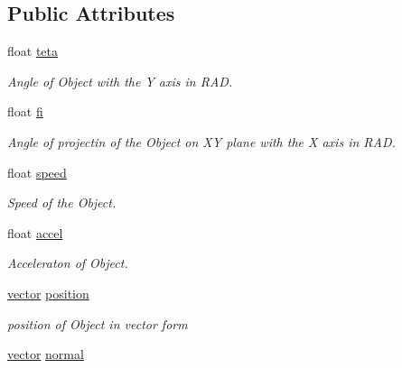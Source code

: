 \subsection*{\-Public \-Attributes}
\begin{DoxyCompactItemize}
\item 
\hypertarget{classobject_ab88f69538586ed8b4eccdd72ff9736e9}{float \hyperlink{classobject_ab88f69538586ed8b4eccdd72ff9736e9}{teta}}\label{classobject_ab88f69538586ed8b4eccdd72ff9736e9}

\begin{DoxyCompactList}\small\item\em \-Angle of \-Object with the \-Y axis in \-R\-A\-D. \end{DoxyCompactList}\item 
\hypertarget{classobject_a9ca57ce8fdbfbc35555f0a976930d0ac}{float \hyperlink{classobject_a9ca57ce8fdbfbc35555f0a976930d0ac}{fi}}\label{classobject_a9ca57ce8fdbfbc35555f0a976930d0ac}

\begin{DoxyCompactList}\small\item\em \-Angle of projectin of the \-Object on \-X\-Y plane with the \-X axis in \-R\-A\-D. \end{DoxyCompactList}\item 
\hypertarget{classobject_ad573f9a5c827003cd34d4ba9bf8be84d}{float \hyperlink{classobject_ad573f9a5c827003cd34d4ba9bf8be84d}{speed}}\label{classobject_ad573f9a5c827003cd34d4ba9bf8be84d}

\begin{DoxyCompactList}\small\item\em \-Speed of the \-Object. \end{DoxyCompactList}\item 
\hypertarget{classobject_aa1021a0dea038eced722b779f17f22b9}{float \hyperlink{classobject_aa1021a0dea038eced722b779f17f22b9}{accel}}\label{classobject_aa1021a0dea038eced722b779f17f22b9}

\begin{DoxyCompactList}\small\item\em \-Acceleraton of \-Object. \end{DoxyCompactList}\item 
\hypertarget{classobject_af2732a07f393af7f39e20b47e397211e}{\hyperlink{classvector}{vector} \hyperlink{classobject_af2732a07f393af7f39e20b47e397211e}{position}}\label{classobject_af2732a07f393af7f39e20b47e397211e}

\begin{DoxyCompactList}\small\item\em position of \-Object in vector form \end{DoxyCompactList}\item 
\hypertarget{classobject_ad184b57011598eeb8432a98bee87ca0f}{\hyperlink{classvector}{vector} \hyperlink{classobject_ad184b57011598eeb8432a98bee87ca0f}{normal}}\label{classobject_ad184b57011598eeb8432a98bee87ca0f}


\end{DoxyCompactItemize}

